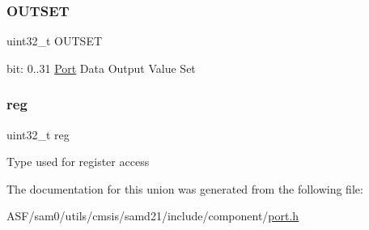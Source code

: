\subsubsection{\texorpdfstring{OUTSET}{OUTSET}}
{\footnotesize\ttfamily uint32\+\_\+t O\+U\+T\+S\+ET}

bit\+: 0..31 \mbox{\hyperlink{struct_port}{Port}} Data Output Value Set \mbox{\label{union_p_o_r_t___o_u_t_s_e_t___type_a6b91636401516a477989a336376d7b40}} 
\subsubsection{\texorpdfstring{reg}{reg}}
{\footnotesize\ttfamily uint32\+\_\+t reg}

Type used for register access 

The documentation for this union was generated from the following file\+:\begin{DoxyCompactItemize}
\item 
A\+S\+F/sam0/utils/cmsis/samd21/include/component/\mbox{\hyperlink{utils_2cmsis_2samd21_2include_2component_2port_8h}{port.\+h}}\end{DoxyCompactItemize}
